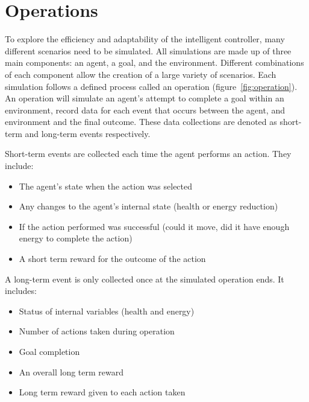 \section{Operations} \label{sec:operations}
To explore the efficiency and adaptability of the intelligent controller, many different scenarios need to be simulated.
All simulations are made up of three main components: an agent, a goal, and the environment.
Different combinations of each component allow the creation of a large variety of scenarios.
Each simulation follows a defined process called an operation (figure~\ref{fig:operation}).
An operation will simulate an agent's attempt to complete a goal within an environment, record data for each event that occurs between the agent, and environment and the final outcome.
These data collections are denoted as short-term and long-term events respectively.

\noindent
Short-term events are collected each time the agent performs an action.
They include:

\begin{itemize}
  \item The agent's state when the action was selected
  \item Any changes to the agent's internal state (health or energy reduction)
  \item If the action performed was successful (could it move, did it have enough energy to complete the action)
  \item A short term reward for the outcome of the action
\end{itemize}

\noindent
A long-term event is only collected once at the simulated operation ends.
It includes:

\begin{itemize}
  \item Status of internal variables (health and energy)
  \item Number of actions taken during operation
  \item Goal completion
  \item An overall long term reward
  \item Long term reward given to each action taken
\end{itemize}

